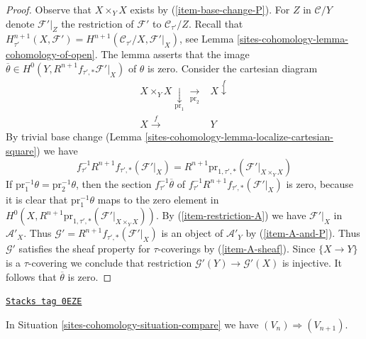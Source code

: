 \begin{proof}
Observe that $X \times_Y X$ exists by (\ref{item-base-change-P}).
For $Z$ in $\mathcal{C}/Y$ denote $\mathcal{F}'|_Z$
the restriction of $\mathcal{F}'$ to $\mathcal{C}_{\tau'}/Z$.
Recall that $H^{n + 1}_{\tau'}(X, \mathcal{F}') =
H^{n + 1}(\mathcal{C}_{\tau'}/X, \mathcal{F}'|_X)$, see
Lemma \ref{sites-cohomology-lemma-cohomology-of-open}.
The lemma asserts that the
image $\overline{\theta} \in H^0(Y, R^{n + 1}f_{\tau', *}\mathcal{F}'|_X)$
of $\theta$ is zero. Consider the cartesian diagram
$$
\begin{array}{cc}X \times_Y X \underset{\text{pr}_1}{\downarrow}\underset{\text{pr}_2}{\longrightarrow} & X \overset{f}{\downarrow} \\ X \overset{f}{\longrightarrow} & Y\end{array}
$$
By trivial base change (Lemma \ref{sites-cohomology-lemma-localize-cartesian-square})
we have
$$
f_{\tau'}^{-1}R^{n + 1}f_{\tau', *}(\mathcal{F}'|_X) =
R^{n + 1}\text{pr}_{1, \tau', *}(\mathcal{F}'|_{X \times_Y X})
$$
If $\text{pr}_1^{-1}\theta = \text{pr}_2^{-1}\theta$,
then the section $f_{\tau'}^{-1}\overline{\theta}$ of
$f_{\tau'}^{-1}R^{n + 1}f_{\tau', *}(\mathcal{F}'|_X)$ is zero,
because it is clear that $\text{pr}_1^{-1}\theta$ maps to the zero element in
$H^0(X, R^{n + 1}\text{pr}_{1, \tau', *}(\mathcal{F}'|_{X \times_Y X}))$.
By (\ref{item-restriction-A}) we have $\mathcal{F}'|_X$ in $\mathcal{A}'_X$.
Thus $\mathcal{G}' = R^{n + 1}f_{\tau', *}(\mathcal{F}'|_X)$
is an object of $\mathcal{A}'_Y$ by (\ref{item-A-and-P}).
Thus $\mathcal{G}'$ satisfies the sheaf property for
$\tau$-coverings by (\ref{item-A-sheaf}).
Since $\{X \to Y\}$ is a $\tau$-covering we conclude
that restriction $\mathcal{G}'(Y) \to \mathcal{G}'(X)$ is injective.
It follows that $\overline{\theta}$ is zero.
\end{proof}

\begin{lemma}
\label{sites-cohomology-lemma-induction-step-V-C-general}
\href{https://stacks.math.columbia.edu/tag/0EZE}{\texttt{Stacks tag 0EZE}}

In Situation \ref{sites-cohomology-situation-compare} we have $(V_n) \Rightarrow (V_{n + 1})$.
\end{lemma}

